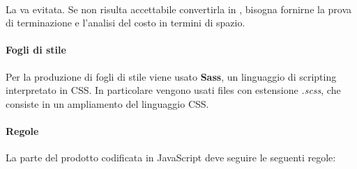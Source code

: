  \paragraph{}
 La  va evitata. Se non risulta accettabile convertirla in , bisogna fornirne la prova di terminazione e l'analisi del costo in termini di spazio.

 \paragraph{Fogli di stile}
 Per la produzione di fogli di stile viene usato \textbf{Sass}, un linguaggio di scripting interpretato in CSS. In particolare vengono usati files con estensione \textit{.scss}, che consiste in un ampliamento del linguaggio CSS.

\paragraph{Regole }
La parte del prodotto codificata in JavaScript deve seguire le seguenti regole:
